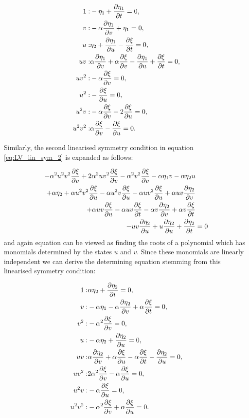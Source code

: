 \begin{align}
1:&- \eta_1 +\pdv{\eta_1}{t}=0,\\
v:&- \alpha \pdv{\eta_1}{v}  + \eta_1=0,\\
u:&\eta_2 + \pdv{\eta_1}{u}  - \pdv{\xi}{t}=0,\\
u v:&\alpha \pdv{\eta_1}{v}  + \alpha \pdv{\xi}{v}  - \pdv{\eta_1}{u}  + \pdv{\xi}{t}=0,\\
u v^{2}:&- \alpha \pdv{\xi}{v} =0,\\
u^{2}:&- \pdv{\xi}{u} =0,\\
u^{2} v:&- \alpha \pdv{\xi}{v}  + 2 \pdv{\xi}{u} =0,\\
u^{2} v^{2}:&\alpha \pdv{\xi}{v} - \pdv{\xi}{u}=0.
\end{align}


Similarly, the second linearised symmetry condition in equation \eqref{eq:LV_lin_sym_2} is expanded as follows:



\begin{align}
  - \alpha^{2} u^{2} v^{2} \pdv{\xi}{v}  + 2 \alpha^{2} u v^{2} \pdv{\xi}{v} - \alpha^{2} v^{2} \pdv{\xi}{v} - \alpha \eta_1 v - \alpha \eta_2 u&\nonumber\\
  + \alpha \eta_2 + \alpha u^{2} v^{2} \pdv{\xi}{u} - \alpha u^{2} v \pdv{\xi}{u} - \alpha u v^{2} \pdv{\xi}{u} + \alpha u v \pdv{\eta_2}{v}&\nonumber\\
  + \alpha u v \pdv{\xi}{u}  - \alpha u v \pdv{\xi}{t} - \alpha v \pdv{\eta_2}{v}  + \alpha v \pdv{\xi}{t}&\label{eq:LV_lin_sym_1_expanded}\\
  - u v \pdv{\eta_2}{u}  + u \pdv{\eta_2}{u}  + \pdv{\eta_2}{t}&=0\nonumber
\end{align}
and again equation can be viewed as finding the roots of a polynomial which has monomials determined by the states $u$ and $v$. Since these monomials are linearly independent we can derive the determining equation stemming from this linearised symmetry condition:



\begin{align}
1:&\alpha \eta_2 + \pdv{\eta_2}{t}=0,\\
v:&- \alpha \eta_1 - \alpha \pdv{\eta_2}{v}  + \alpha \pdv{\xi}{t}=0,\\
v^{2}:&- \alpha^{2} \pdv{\xi}{v} =0,\\
u:&- \alpha \eta_2 + \pdv{\eta_2}{u} =0,\\
u v:&\alpha \pdv{\eta_2}{v}  + \alpha \pdv{\xi}{u}  - \alpha \pdv{\xi}{t} - \pdv{\eta_2}{u} =0,\\
u v^{2}:&2 \alpha^{2} \pdv{\xi}{v}  - \alpha \pdv{\xi}{u} =0,\\
u^{2} v:&- \alpha \pdv{\xi}{u} =0,\\
u^{2} v^{2}:&- \alpha^{2} \pdv{\xi}{v}  + \alpha \pdv{\xi}{u} =0.
\end{align}
